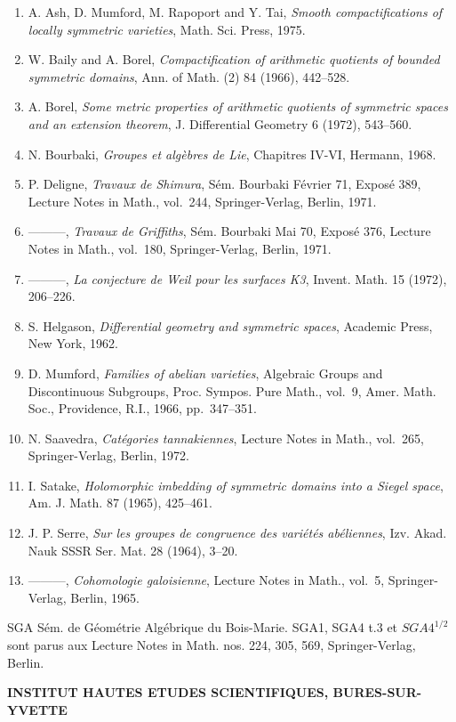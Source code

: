 \documentclass[10pt,a4paper]{article}
\providecommand{\tightlist}{\setlength{\itemsep}{0pt}\setlength{\parskip}{0pt}}
\begin{document}
\begin{enumerate}
\def\labelenumi{\arabic{enumi}.}
\tightlist
\item
  A. Ash, D. Mumford, M. Rapoport and Y. Tai, \emph{Smooth compactifications of locally symmetric varieties}, Math. Sci. Press, 1975.
\item
  W. Baily and A. Borel, \emph{Compactification of arithmetic quotients of bounded symmetric domains}, Ann. of Math. (2) 84 (1966), 442--528.
\item
  A. Borel, \emph{Some metric properties of arithmetic quotients of symmetric spaces and an extension theorem}, J. Differential Geometry 6 (1972), 543--560.
\item
  N. Bourbaki, \emph{Groupes et algèbres de Lie}, Chapitres IV-VI, Hermann, 1968.
\item
  P. Deligne, \emph{Travaux de Shimura}, Sém. Bourbaki Février 71, Exposé 389, Lecture Notes in Math., vol.~244, Springer-Verlag, Berlin, 1971.
\item
  ---------, \emph{Travaux de Griffiths}, Sém. Bourbaki Mai 70, Exposé 376, Lecture Notes in Math., vol.~180, Springer-Verlag, Berlin, 1971.
\item
  ---------, \emph{La conjecture de Weil pour les surfaces K3}, Invent. Math. 15 (1972), 206--226.
\item
  S. Helgason, \emph{Differential geometry and symmetric spaces}, Academic Press, New York, 1962.
\item
  D. Mumford, \emph{Families of abelian varieties}, Algebraic Groups and Discontinuous Subgroups, Proc. Sympos. Pure Math., vol.~9, Amer. Math. Soc., Providence, R.I., 1966, pp.~347--351.
\item
  N. Saavedra, \emph{Catégories tannakiennes}, Lecture Notes in Math., vol.~265, Springer-Verlag, Berlin, 1972.
\item
  I. Satake, \emph{Holomorphic imbedding of symmetric domains into a Siegel space}, Am. J. Math. 87 (1965), 425--461.
\item
  J. P. Serre, \emph{Sur les groupes de congruence des variétés abéliennes}, Izv. Akad. Nauk SSSR Ser. Mat. 28 (1964), 3--20.
\item
  ---------, \emph{Cohomologie galoisienne}, Lecture Notes in Math., vol.~5, Springer-Verlag, Berlin, 1965.
\end{enumerate}

SGA Sém. de Géométrie Algébrique du Bois-Marie. SGA1, SGA4 t.3 et \(SGA4^{1/2}\) sont parus aux Lecture Notes in Math. nos. 224, 305, 569, Springer-Verlag, Berlin.

\textbf{INSTITUT HAUTES ETUDES SCIENTIFIQUES, BURES-SUR-YVETTE}
\end{document}
